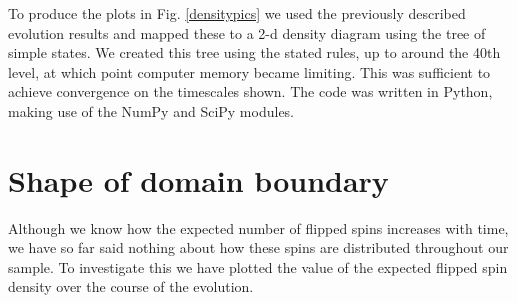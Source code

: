 To produce the plots in Fig. \ref{densitypics} we used the previously
described evolution results and mapped these to a 2-d density diagram
using the tree of simple states. We created this tree using the stated
rules, up to around the 40th level, at which point computer memory
became limiting. This was sufficient to achieve convergence on the
timescales shown. The code was written in Python, making use of the
NumPy and SciPy modules.



\section{Shape of domain boundary}

Although we know how the expected number of flipped spins increases
with time, we have so far said nothing about how these spins are
distributed throughout our sample. To investigate this we have plotted
the value of the expected flipped spin density over the course of the
evolution.

